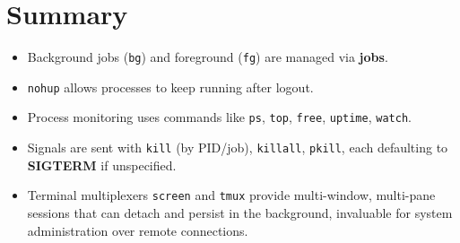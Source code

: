 \documentclass[a4paper]{report}
\begin{document}
    \section*{Summary}
    \begin{itemize}
        \item Background jobs (\texttt{bg}) and foreground (\texttt{fg}) are managed via \textbf{jobs}.
        \item \texttt{nohup} allows processes to keep running after logout.
        \item Process monitoring uses commands like \texttt{ps}, \texttt{top}, \texttt{free}, \texttt{uptime}, \texttt{watch}.
        \item Signals are sent with \texttt{kill} (by PID/job), \texttt{killall}, \texttt{pkill}, each defaulting to \textbf{SIGTERM} if unspecified.
        \item Terminal multiplexers \texttt{screen} and \texttt{tmux} provide multi-window, multi-pane sessions that can detach and persist in the background, invaluable for system administration over remote connections.
    \end{itemize}



\newpage
\end{document}
